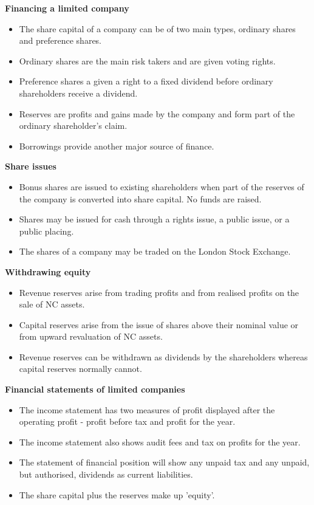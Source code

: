 \documentclass{report}
\begin{document}
\textbf{Financing a limited company}
\begin{itemize}
    \item The share capital of a company can be of two main types, ordinary shares and preference shares.
    \item Ordinary shares are the main risk takers and are given voting rights.
    \item Preference shares a given a right to a fixed dividend before ordinary shareholders receive a dividend.
    \item Reserves are profits and gains made by the company and form part of the ordinary shareholder's claim.
    \item Borrowings provide another major source of finance.\\
\end{itemize}

\textbf{Share issues}
\begin{itemize}
    \item Bonus shares are issued to existing shareholders when part of the reserves of the company is converted into share capital. No funds are raised.
    \item Shares may be issued for cash through a rights issue, a public issue, or a public placing.
    \item The shares of a company may be traded on the London Stock Exchange.\\
\end{itemize}

\textbf{Withdrawing equity}
\begin{itemize}
    \item Revenue reserves arise from trading profits and from realised profits on the sale of NC assets.
    \item Capital reserves arise from the issue of shares above their nominal value or from upward revaluation of NC assets.
    \item Revenue reserves can be withdrawn as dividends by the shareholders whereas capital reserves normally cannot.\\
\end{itemize}

\textbf{Financial statements of limited companies}
\begin{itemize}
    \item The income statement has two measures of profit displayed after the operating profit - profit before tax and profit for the year.
    \item The income statement also shows audit fees and tax on profits for the year.
    \item The statement of financial position will show any unpaid tax and any unpaid, but authorised, dividends as current liabilities.
    \item The share capital plus the reserves make up 'equity'.
\end{itemize}
\end{document}
